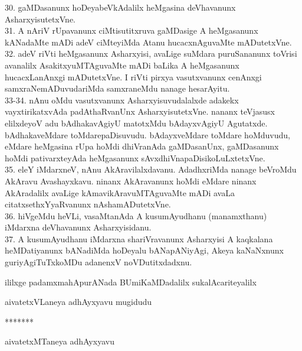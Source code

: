 \documentclass{article}
\begin{document}
30. gaMDasanunx hoDeyabeVkAdalilx heMgasina deVhavanunx AsharxyisutetxVne.\\
31. A nAriV rUpavanunx ciMtisutitxruva gaMDasige A heMgasanunx kANadaMte mADi adeV ciMteyiMda Atanu hucacxnAguvaMte mADutetxVne.\\
32. adeV riVti heMgasanunx Asharxyisi, avaLige suMdara puruSananunx toVrisi avanalilx AsakitxyuMTAguvaMte mADi baLika A heMgasanunx hucacxLanAnxgi mADutetxVne. I riVti pirxya vasutxvanunx cenAnxgi samxraNemADuvudariMda samxraneMdu nanage hesarAyitu.\\
33-34. nAnu oMdu vasutxvanunx Asharxyisuvudalalxde adakekx vayxtirikatxvAda padAthaRvanUnx AsharxyisutetxVne. nananx teVjasusx elilxdeyoV adu bAdhakavAgiyU matotxMdu bAdayxvAgiyU Agutatxde. bAdhakaveMdare toMdarepaDisuvudu. bAdayxveMdare toMdare hoMduvudu, eMdare heMgasina rUpa hoMdi dhiVranAda gaMDasanUnx, gaMDasanunx hoMdi pativarxteyAda heMgasanunx sAvxdhiVnapaDisikoLuLxtetxVne.\\
35. eleY iMdarxneV, nAnu AkAravilalxdavanu. AdadhxriMda nanage beVroMdu AkAravu Avashayxkavu. ninanx AkAravanunx hoMdi eMdare ninanx AkAradalilx avaLige kAmavikAravuMTAguvaMte mADi avaLa citatxsethxYyaRvanunx nAshamADutetxVne.\\
36. hiVgeMdu heVLi, vasaMtanAda A kusumAyudhanu (manamxthanu) iMdarxna deVhavanunx Asharxyisidanu.\\
37. A kusumAyudhanu iMdarxna shariVravanunx Asharxyisi A kaqkalana heMDatiyanunx bANadiMda hoDeyalu bANapANiyAgi, Akeya kaNaNxnunx guriyAgiTuTxkoMDu adanenxV noVDutitxdadxnu.\\

\begin{center}
ililxge padamxmahApurANada BUmiKaMDadalilx sukalAcariteyalilx
\end{center}

\begin{center}
aivatetxVLaneya adhAyxyavu mugidudu
\end{center}

\begin{center}
*******
\end{center}

\begin{center}
aivatetxMTaneya adhAyxyavu
\end{center}
\end{document}
